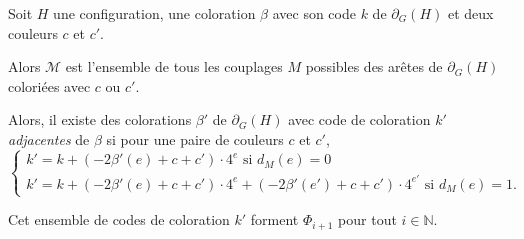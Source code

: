 \documentclass{beamer}
\begin{document}
\begin{frame}

Soit $H$ une configuration, une coloration $\beta$ avec son code $k$ de $\partial_G(H)$ et deux couleurs $c$ et $c'$. 

Alors $\mathcal{M}$ est l'ensemble de tous les couplages $M$ possibles des arêtes de $\partial_G(H)$ coloriées avec $c$ ou $c'$.

\pause

Alors, il existe des colorations $\beta'$ de $\partial_G(H)$ avec code de coloration $k'$ \emph{adjacentes} de $\beta$ si pour une paire de couleurs $c$ et $c'$,
$$
\begin{cases}
k' = k + (-2\beta'(e)+c + c')\cdot 4^{e} \textrm{ si  }d_M(e)=0 \\
k' = k  + (-2\beta'(e)+c + c')\cdot 4^{e} + (-2\beta'(e')+c + c')\cdot 4^{e'} \textrm{ si  }d_M(e)=1.
\end{cases}
$$

Cet ensemble de codes de coloration $k'$ forment $\Phi_{i+1}$ pour tout $i\in \mathbb{N}$.
\end{frame}


%
%
%
%
%
%
%
%
%
%
%
%
%
%
%
\end{document}

